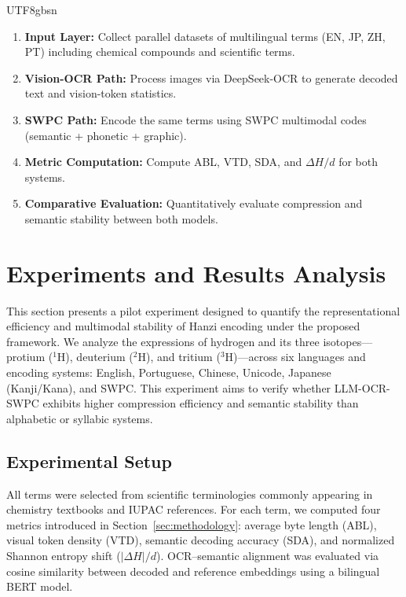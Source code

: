 \documentclass[conference]{IEEEtran}
\begin{document}
\begin{CJK*}{UTF8}{gbsn}
\begin{enumerate}
    \item \textbf{Input Layer:} Collect parallel datasets of multilingual terms (EN, JP, ZH, PT) including chemical compounds and scientific terms.  
    \item \textbf{Vision-OCR Path:} Process images via DeepSeek-OCR to generate decoded text and vision-token statistics.  
    \item \textbf{SWPC Path:} Encode the same terms using SWPC multimodal codes (semantic + phonetic + graphic).  
    \item \textbf{Metric Computation:} Compute ABL, VTD, SDA, and $\Delta H/d$ for both systems.  
    \item \textbf{Comparative Evaluation:} Quantitatively evaluate compression and semantic stability between both models.
\end{enumerate}

\section{Experiments and Results Analysis}
\label{sec:results}

This section presents a pilot experiment designed to quantify the representational efficiency and multimodal stability of Hanzi encoding under the proposed framework.  
We analyze the expressions of hydrogen and its three isotopes—protium ($^{1}$H), deuterium ($^{2}$H), and tritium ($^{3}$H)—across six languages and encoding systems: English, Portuguese, Chinese, Unicode, Japanese (Kanji/Kana), and SWPC.  
This experiment aims to verify whether LLM-OCR-SWPC exhibits higher compression efficiency and semantic stability than alphabetic or syllabic systems.

\subsection{Experimental Setup}

All terms were selected from scientific terminologies commonly appearing in chemistry textbooks and IUPAC references.  
For each term, we computed four metrics introduced in Section~\ref{sec:methodology}:  
average byte length (ABL), visual token density (VTD), semantic decoding accuracy (SDA), and normalized Shannon entropy shift ($|\Delta H|/d$).  
OCR–semantic alignment was evaluated via cosine similarity between decoded and reference embeddings using a bilingual BERT model.


\end{CJK*}
\end{document}
